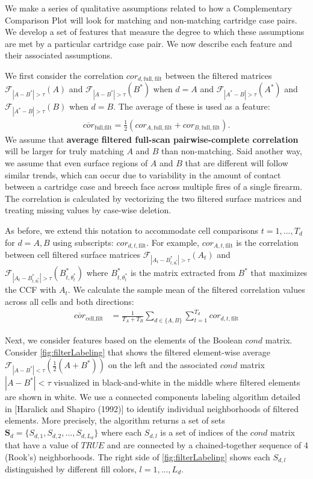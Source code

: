 \documentclass[
]{jdssv}
\begin{document}
We make a series of qualitative assumptions related to how a
Complementary Comparison Plot will look for matching and non-matching
cartridge case pairs. We develop a set of features that measure the
degree to which these assumptions are met by a particular cartridge case
pair. We now describe each feature and their associated assumptions.

We first consider the correlation \(cor_{d,\text{full},\text{filt}}\)
between the filtered matrices \(\mathcal{F}_{|A - B^*| > \tau}(A)\) and
\(\mathcal{F}_{|A - B^*| > \tau}(B^*)\) when \(d = A\) and
\(\mathcal{F}_{|A^* - B| > \tau}(A^*)\) and
\(\mathcal{F}_{|A^* - B| > \tau}(B)\) when \(d = B\). The average of
these is used as a feature: \begin{align*}
\overline{cor}_{\text{full},\text{filt}} = \frac{1}{2}\left(cor_{A,\text{full},\text{filt}} + cor_{B,\text{full},\text{filt}}\right).
\end{align*} We assume that
\textbf{average filtered full-scan pairwise-complete correlation} will
be larger for truly matching \(A\) and \(B\) than non-matching. Said
another way, we assume that even surface regions of \(A\) and \(B\) that
are different will follow similar trends, which can occur due to
variability in the amount of contact between a cartridge case and breech
face across multiple fires of a single firearm. The correlation is
calculated by vectorizing the two filtered surface matrices and treating
missing values by case-wise deletion.

As before, we extend this notation to accommodate cell comparisons
\(t = 1,...,T_d\) for \(d = A,B\) using subscripts:
\(cor_{d,t,\text{filt}}\). For example, \(cor_{A,t,\text{filt}}\) is the
correlation between cell filtered surface matrices
\(\mathcal{F}_{|A_t - B_{t,\theta_t^*}^*| > \tau}(A_t)\) and
\(\mathcal{F}_{|A_t - B_{t,\theta_t^*}^*| > \tau}(B_{t,\theta_t^*}^*)\)
where \(B_{t,\theta_t^*}^*\) is the matrix extracted from \(B^*\) that
maximizes the CCF with \(A_t\). We calculate the sample mean of the
filtered correlation values across all cells and both directions:
\begin{align*}
\overline{cor}_{\text{cell},\text{filt}} &= \frac{1}{T_A + T_B} \sum_{d \in \{A,B\}} \sum_{t=1}^{T_d} cor_{d,t,\text{filt}}
\end{align*}

Next, we consider features based on the elements of the Boolean \(cond\)
matrix. Consider \autoref{fig:filterLabeling} that shows the filtered
element-wise average
\(\mathcal{F}_{|A - B^*| < \tau}\left(\frac{1}{2}(A + B^*)\right)\) on
the left and the associated \(cond\) matrix \(|A - B^*| < \tau\)
visualized in black-and-white in the middle where filtered elements are
shown in white. We use a connected components labeling algorithm
detailed in {[}Haralick and Shapiro (1992){]} to identify individual
neighborhoods of filtered elements. More precisely, the algorithm
returns a set of sets \(\pmb{S}_d = \{S_{d,1},S_{d,2},...,S_{d,L_d}\}\)
where each \(S_{d,l}\) is a set of indices of the \(cond\) matrix that
have a value of \(TRUE\) and are connected by a chained-together
sequence of 4 (Rook's) neighborhoods. The right side of
\autoref{fig:filterLabeling} shows each \(S_{d,l}\) distinguished by
different fill colors, \(l = 1,...,L_d\).
\end{document}
